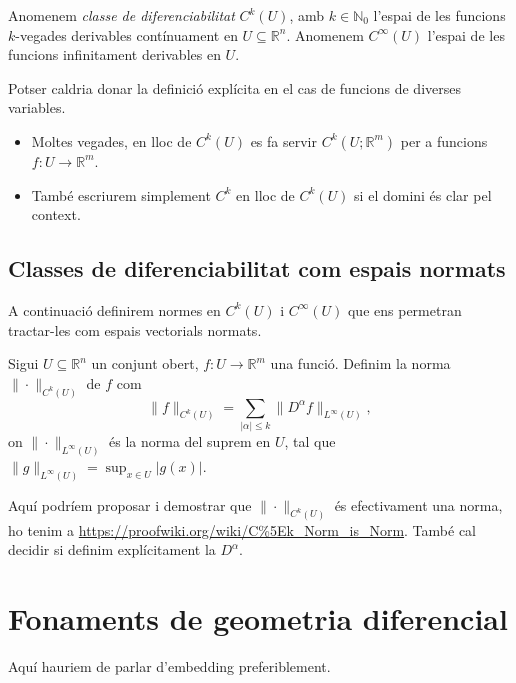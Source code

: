 \begin{defi}
    Anomenem \textit{classe de diferenciabilitat} $C^k(U)$, amb $k\in\mathbb N_0$ l'espai de les funcions $k$-vegades derivables contínuament en $U\subseteq\mathbb R^n$. Anomenem $C^\infty(U)$ l'espai de les funcions infinitament derivables en $U$.
\end{defi}
\begin{obss}{\color{blue} Potser caldria donar la definició explícita en el cas de funcions de diverses variables.}
\end{obss}
\begin{itemize}
    \item Moltes vegades, en lloc de $C^k(U)$ es fa servir $C^k(U;\mathbb R^m)$ per a funcions $f:U\to\mathbb R^m$.
    \item També escriurem simplement $C^k$ en lloc de $C^k(U)$ si el domini és clar pel context.
\end{itemize}

\subsection{Classes de diferenciabilitat com espais normats}
A continuació definirem normes en $C^k(U)$ i $C^\infty(U)$ que ens permetran tractar-les com espais vectorials normats.
\begin{defi}
    Sigui $U\subseteq\mathbb R^n$ un conjunt obert, $f:U\to\mathbb R^m$ una funció. Definim la norma $\|\cdot\|_{C^k(U)}$ de $f$ com
    \begin{equation*}
        \|f\|_{C^k(U)} = \sum_{|\alpha|\le k} \|D^\alpha f\|_{L^\infty(U)},
    \end{equation*}
    on $\|\cdot\|_{L^\infty(U)}$ és la norma del suprem en $U$, tal que $\|g\|_{L^\infty(U)} = \sup_{x\in U} |g(x)|$.
\end{defi}
{\color{blue} Aquí podríem proposar i demostrar que $\|\cdot\|_{C^k(U)}$ és efectivament una norma, ho tenim a \url{https://proofwiki.org/wiki/C%5Ek_Norm_is_Norm}. També cal decidir si definim explícitament la $D^\alpha$.}

\section{Fonaments de geometria diferencial}
Aquí hauriem de parlar d'embedding preferiblement.






\newpage
